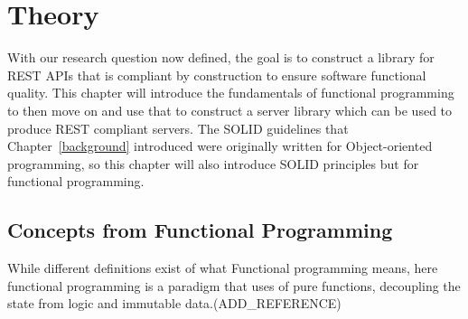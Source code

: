 \chapter{Theory}\label{theory} 

With our research question now defined, the goal is to construct a library for
REST APIs that is compliant by construction to ensure software functional
quality. This chapter will introduce the fundamentals of functional programming
to then move on and use that to construct a server library which can be used to
produce REST compliant servers. The SOLID guidelines that
Chapter~\ref{background} introduced were originally written for Object-oriented
programming, so this chapter will also introduce SOLID principles but for
functional programming. 

\section{Concepts from Functional Programming}\label{functionalprogramming}

 While different definitions exist of what Functional programming means, here 
 functional programming is a paradigm that uses of pure functions,
 decoupling the state from logic and immutable data.(ADD\_REFERENCE)

